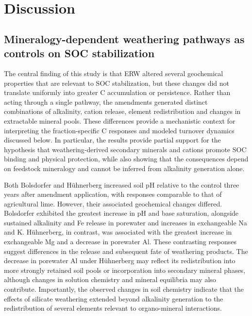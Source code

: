 \documentclass[preprint,12pt]{elsarticle}
\begin{document}
\section{Discussion}
\label{sec:discussion}

\subsection{Mineralogy-dependent weathering pathways as controls on SOC stabilization}
\label{subsec:treatment_effects}

The central finding of this study is that ERW altered several geochemical properties that are relevant to SOC stabilization, but these changes did not translate uniformly into greater C accumulation or persistence. Rather than acting through a single pathway, the amendments generated distinct combinations of alkalinity, cation release, element redistribution and changes in extractable mineral pools. These differences provide a mechanistic context for interpreting the fraction-specific C responses and modeled turnover dynamics discussed below. In particular, the results provide partial support for the hypothesis that weathering-derived secondary minerals and cations promote SOC binding and physical protection, while also showing that the consequences depend on feedstock mineralogy and cannot be inferred from alkalinity generation alone.

Both Bolsdorfer and Hühnerberg increased soil pH relative to the control three years after amendment application, with responses comparable to that of agricultural lime. However, their associated geochemical changes differed. Bolsdorfer exhibited the greatest increase in pH and base saturation, alongside sustained alkalinity and Fe release in porewater and increases in exchangeable Na and K. Hühnerberg, in contrast, was associated with the greatest increase in exchangeable Mg and a decrease in porewater Al. These contrasting responses suggest differences in the release and subsequent fate of weathering products. The decrease in porewater Al under Hühnerberg may reflect its redistribution into more strongly retained soil pools or incorporation into secondary mineral phases, although changes in solution chemistry and mineral equilibria may also contribute. Importantly, the observed changes in soil chemistry indicate that the effects of silicate weathering extended beyond alkalinity generation to the redistribution of several elements relevant to organo-mineral interactions.
\end{document}
